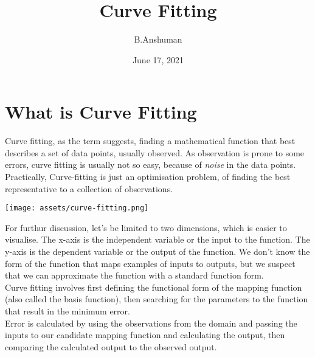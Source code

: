\documentclass{article}
\title{Curve Fitting}
\author{B.Anshuman}
\date{June 17, 2021}
\begin{document}
\maketitle
\section*{What is Curve Fitting}
Curve fitting, as the term suggests, finding a mathematical function that best describes a set of data points, usually observed. As observation is prone to some errors, curve fitting is usually not so easy, because of \textit{noise} in the data points. Practically, Curve-fitting is just an optimisation problem, of finding the best representative to a collection of observations.
\begin{center}
    \centering
    \texttt{[image: assets/curve-fitting.png]}
\end{center}
For furthur discussion, let's be limited to two dimensions, which is easier to visualise. The x-axis is the independent variable or the input to the function. The y-axis is the dependent variable or the output of the function. We don’t know the form of the function that maps examples of inputs to outputs, but we suspect that we can approximate the function with a standard function form.\\
Curve fitting involves first defining the functional form of the mapping function (also called the basis function), then searching for the parameters to the function that result in the minimum error.\\
Error is calculated by using the observations from the domain and passing the inputs to our candidate mapping function and calculating the output, then comparing the calculated output to the observed output.
\end{document}
